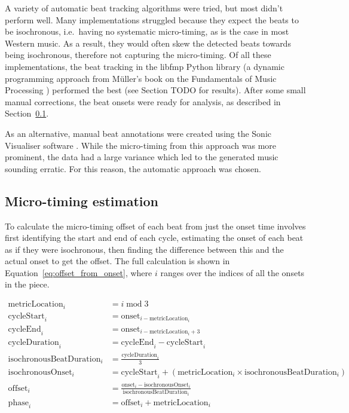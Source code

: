 \documentclass[12pt,twoside,openright]{report}
\begin{document}
A variety of automatic beat tracking algorithms were tried, but most didn't
perform well. Many implementations struggled because they expect the beats to be
isochronous, i.e.\ having no systematic micro-timing, as is the case in most
Western music. As a result, they would often skew the detected beats towards
being isochronous, therefore not capturing the micro-timing. Of all these
implementations, the beat tracking in the libfmp Python library \cite{mueller2021} (a
dynamic programming approach from Müller's book on the Fundamentals of Music Processing
\cite{mueller2021b}) performed the best (see Section TODO for results). After some
small manual corrections, the beat onsets were ready for analysis, as described
in Section~\ref{waltz_micro-timing}.

As an alternative, manual beat annotations were created using the Sonic
Visualiser software \cite{cannam2010}. While the micro-timing from this approach was
more prominent, the data had a large variance which led to the generated music
sounding erratic. For this reason, the automatic approach was chosen.


\subsection{Micro-timing estimation} \label{waltz_micro-timing}

To calculate the micro-timing offset of each beat from just the onset time
involves first identifying the start and end of each cycle, estimating the onset
of each beat as if they were isochronous, then finding the difference between this
and the actual onset to get the offset. The full calculation is shown in
Equation~\ref{eq:offset_from_onset}, where $i$ ranges over the indices of all the onsets in the piece.

\begin{equation}
\begin{split}
    \mathrm{metricLocation}_i &= i \;\mathrm{mod}\; 3 \\
    \mathrm{cycleStart}_i     &= \mathrm{onset}_{i-\mathrm{metricLocation}_i} \\
    \mathrm{cycleEnd}_i       &= \mathrm{onset}_{i-\mathrm{metricLocation}_i+3} \\
    \mathrm{cycleDuration}_i  &= \mathrm{cycleEnd}_i - \mathrm{cycleStart}_i \\
    \mathrm{isochronousBeatDuration}_i &= \frac{\mathrm{cycleDuration}_i}{3} \\
    \mathrm{isochronousOnset}_i &= \mathrm{cycleStart}_i + (\mathrm{metricLocation}_i \times \mathrm{isochronousBeatDuration}_i) \\
    \mathrm{offset}_i &= \frac{\mathrm{onset}_i-\mathrm{isochronousOnset}_i}{\mathrm{isochronousBeatDuration}_i} \\
    \mathrm{phase}_i          &= \mathrm{offset}_i + \mathrm{metricLocation}_i
\end{split}
\label{eq:offset_from_onset}
\end{equation}
\end{document}
